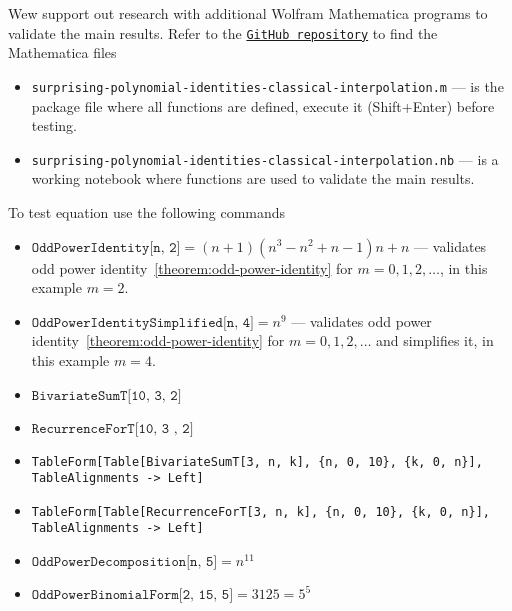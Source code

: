 Wew support out research with additional Wolfram Mathematica programs to validate
the main results.
Refer to the
\href{https://github.com/kolosovpetro/surprising-polynomial-identities-classical-interpolation}
{\texttt{GitHub repository}} to find the Mathematica files
\begin{itemize}
    \item \texttt{surprising-polynomial-identities-classical-interpolation.m} --- is the package file
    where all functions are defined, execute it (Shift+Enter) before testing.
    \item \texttt{surprising-polynomial-identities-classical-interpolation.nb} --- is a working notebook
    where functions are used to validate the main results.
\end{itemize}
To test equation use the following commands
\begin{itemize}
    \item $\texttt{OddPowerIdentity[n, 2]} = (n+1) \left(n^3-n^2+n-1\right) n+n$ --- validates odd power
    identity~\eqref{theorem:odd-power-identity} for $m=0,1,2,\ldots$, in this example $m=2$.
    \item $\texttt{OddPowerIdentitySimplified[n, 4]} = n^9$ --- validates odd power
    identity~\eqref{theorem:odd-power-identity} for $m=0,1,2,\ldots$ and simplifies it, in this example $m=4$.
    \item $\texttt{BivariateSumT[10, 3, 2]}$
    \item $\texttt{RecurrenceForT[10, 3 , 2]}$
    \item \texttt{TableForm[Table[BivariateSumT[3, n, k], \{n, 0, 10\}, \{k, 0, n\}],
        TableAlignments -> Left]}
    \item \texttt{TableForm[Table[RecurrenceForT[3, n, k], \{n, 0, 10\}, \{k, 0, n\}],
        TableAlignments -> Left]}
    \item $\texttt{OddPowerDecomposition[n, 5]} = n^{11}$
    \item $\texttt{OddPowerBinomialForm[2, 15, 5]} = 3125 = 5^5$
\end{itemize}
